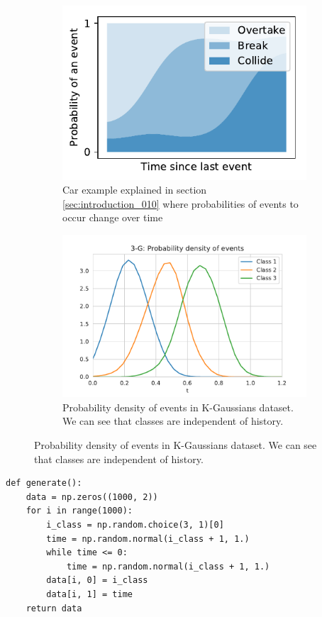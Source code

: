\begin{figure}[H]
\centering
    \begin{subfigure}{.45\textwidth}
        \centering
    	\includegraphics[width=.8\linewidth]{sections/010_neurips2019/paper/images/categorical_evolution.pdf}
        \caption{Car example explained in section \ref{sec:introduction_010} where probabilities of events to occur change over time}
    \label{fig:car_categorical}
    \end{subfigure}%
    \hspace*{10.mm}
    \begin{subfigure}{.45\textwidth}
        \centering
   		\includegraphics[width=.8 \linewidth]{sections/010_neurips2019/paper/images/k-gaussians-density.pdf}
		\caption{Probability density of events in K-Gaussians dataset. We can see that classes are independent of history.}\label{fig:k-gaussians-density}
    \end{subfigure}
\end{figure}

\begin{minipage}{\linewidth}
\begin{verbatim}
def generate():
    data = np.zeros((1000, 2))
    for i in range(1000):
        i_class = np.random.choice(3, 1)[0]
        time = np.random.normal(i_class + 1, 1.)
        while time <= 0:
            time = np.random.normal(i_class + 1, 1.)
        data[i, 0] = i_class
        data[i, 1] = time
    return data
\end{verbatim}
\end{minipage}

